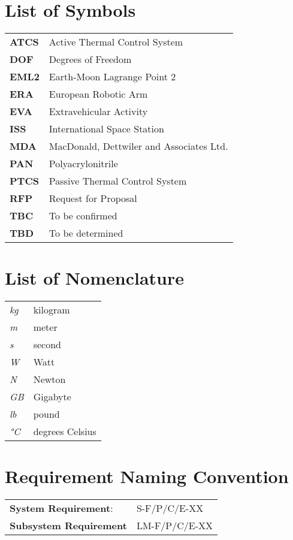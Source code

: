 

\section*{List of Symbols}

\begin{tabular}{ll}
\textbf{ATCS}	&	Active Thermal Control System	\\
\textbf{DOF}	&	Degrees of Freedom	\\
\textbf{EML2}	&	Earth-Moon Lagrange Point 2	\\
\textbf{ERA}	&	European Robotic Arm	\\
\textbf{EVA}	&	Extravehicular Activity	\\
\textbf{ISS}	&	International Space Station	\\
\textbf{MDA}	&	MacDonald, Dettwiler and Associates Ltd.	\\
\textbf{PAN}	&	Polyacrylonitrile	\\
\textbf{PTCS}	&	Passive Thermal Control System	\\
\textbf{RFP}	&	Request for Proposal	\\
\textbf{TBC}	&	To be confirmed	\\
\textbf{TBD}	&	To be determined	\\

\end{tabular}

\section*{List of Nomenclature}

\begin{tabular}{ll}
\textit{kg}	&	kilogram\\
\textit{m}	&	meter	\\
\textit{s}	&	second	\\
\textit{W}	&	Watt	\\
\textit{N}	&	Newton	\\
\textit{GB}	&	Gigabyte\\
\textit{lb}	&	pound	\\
\textit{\si{\celsius}}	&	degrees Celsius

\end{tabular}
\vspace*{\fill}

\newpage

\section*{Requirement Naming Convention}
\begin{tabular}{ll}
\textbf{System Requirement}:	&	S-F/P/C/E-XX	\\
\textbf{Subsystem Requirement}	&	LM-F/P/C/E-XX	\\
\end{tabular}\\
\vspace{10pt}

